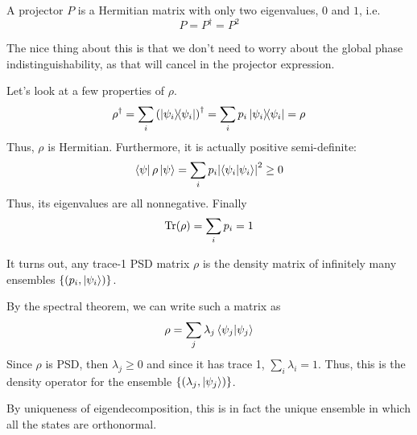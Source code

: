 \begin{definition}
    A projector $P$ is a Hermitian matrix with only two eigenvalues, $0$ and $1$, i.e.
    \[ P = P^{\dagger} = P^2 \]
\end{definition}

The nice thing
about this is that we don't need to worry about the global phase indistinguishability, as that will cancel in the
projector expression.

Let's look at a few properties of 
$\rho$.
\[ \rho^{\dagger} = \sum_i \qty(\ketbra{\psi_i}{\psi_i})^{\dagger} = \sum_i p_i \ketbra{\psi_i}{\psi_i} = \rho \]
Thus, $\rho$ is Hermitian. Furthermore, it is actually positive semi-definite:
\[ \bra{\psi} \rho \ket{\psi} = \sum_i p_i \qty|\braket{\psi_i}{\psi_i}|^2 \geq 0 \]
Thus, its eigenvalues are all nonnegative. Finally
\[ \Tr(\rho) = \sum_i p_i = 1 \]

\begin{theorem}
It turns out, any trace-1 PSD matrix $\rho$ is the density matrix of infinitely many
ensembles $\{(p_i, \ket{\psi_i})\}$.

\begin{proof*}
By the spectral theorem, we can write
such a matrix as
\[ \rho = \sum_j \lambda_j \braket{\psi_j}{\psi_j} \]
Since $\rho$ is PSD, then $\lambda_j \geq 0$ and since it has trace 1, $\sum_{i} \lambda_i = 1$.
Thus, this is the density operator for the ensemble $\{(\lambda_j, \ket{\psi_j})\}$.

By uniqueness of eigendecomposition, this is in fact the unique ensemble in which all the states
are orthonormal.
\end{proof*}
\end{theorem}

